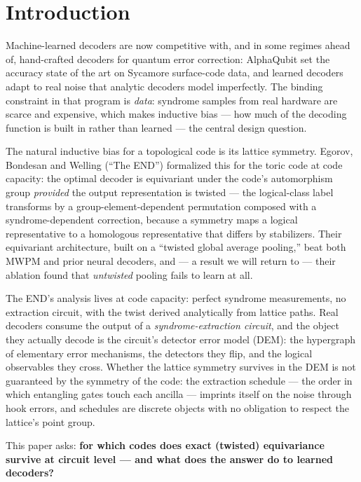 \documentclass[11pt]{article}
\begin{document}
\section{Introduction}

Machine-learned decoders are now competitive with, and in some regimes ahead
of, hand-crafted decoders for quantum error correction: AlphaQubit
\cite{Bausch24} set the accuracy state of the art on Sycamore surface-code
data, and learned decoders adapt to real noise that analytic decoders model
imperfectly. The binding constraint in that program is \emph{data}: syndrome
samples from real hardware are scarce and expensive, which makes inductive
bias --- how much of the decoding function is built in rather than learned
--- the central design question.

The natural inductive bias for a topological code is its lattice symmetry.
Egorov, Bondesan and Welling (``The END'') \cite{Egorov23} formalized this
for the toric code at code capacity: the optimal decoder is equivariant
under the code's automorphism group \emph{provided} the output
representation is twisted --- the logical-class label transforms by a
group-element-dependent permutation composed with a syndrome-dependent
correction, because a symmetry maps a logical representative to a homologous
representative that differs by stabilizers. Their equivariant architecture,
built on a ``twisted global average pooling,'' beat both MWPM and prior
neural decoders, and --- a result we will return to --- their ablation found
that \emph{untwisted} pooling fails to learn at all.

The END's analysis lives at code capacity: perfect syndrome measurements, no
extraction circuit, with the twist derived analytically from lattice paths.
Real decoders consume the output of a \emph{syndrome-extraction circuit},
and the object they actually decode is the circuit's detector error model
(DEM): the hypergraph of elementary error mechanisms, the detectors they
flip, and the logical observables they cross. Whether the lattice symmetry
survives in the DEM is not guaranteed by the symmetry of the code: the
extraction schedule --- the order in which entangling gates touch each
ancilla --- imprints itself on the noise through hook errors, and schedules
are discrete objects with no obligation to respect the lattice's point
group.

This paper asks: \textbf{for which codes does exact (twisted) equivariance
survive at circuit level --- and what does the answer do to learned
decoders?}
\end{document}
